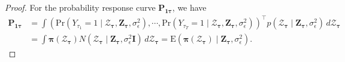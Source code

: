 \begin{proof}
For the probability response curve $\mathbf{P}_{\mathbf{1}\boldsymbol{\tau}}$, we have 
\begin{equation*}
    \begin{split}
       \mathbf{P}_{\mathbf{1}\boldsymbol{\tau}}&=\int (\text{Pr}(Y_{\tau_1}= 1 \mid\boldsymbol{\mathcal{Z}}_{\boldsymbol{\tau}},\mathbf{Z}_{\boldsymbol{\tau}},\sigma_{\epsilon}^2),\cdots,\text{Pr}(Y_{\tau_T}=1 \mid\boldsymbol{\mathcal{Z}}_{\boldsymbol{\tau}},\mathbf{Z}_{\boldsymbol{\tau}},\sigma_{\epsilon}^2))^{\top}p(\boldsymbol{\mathcal{Z}}_{\boldsymbol{\tau}}\mid\mathbf{Z}_{\boldsymbol{\tau}},\sigma_{\epsilon}^2) \, d\boldsymbol{\mathcal{Z}}_{\boldsymbol{\tau}}\\
       &=\int \boldsymbol{\pi}(\boldsymbol{\mathcal{Z}}_{\boldsymbol{\tau}})N(\boldsymbol{\mathcal{Z}}_{\boldsymbol{\tau}}\mid\mathbf{Z}_{\boldsymbol{\tau}},\sigma_{\epsilon}^2\mathbf{I}) \, d\boldsymbol{\mathcal{Z}}_{\boldsymbol{\tau}}=\text{E}(\boldsymbol{\pi}(\boldsymbol{\mathcal{Z}}_{\boldsymbol{\tau}})\mid \mathbf{Z}_{\boldsymbol{\tau}},\sigma_{\epsilon}^2).
    \end{split}
    \label{eq:probcurvecondsignal}
\end{equation*}


\end{proof}
